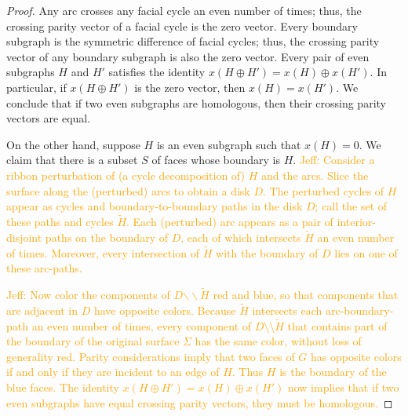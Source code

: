\documentclass[letterpaper,review]{siamart190516}
\def\Z{\mathbb{Z}}
\def\snip{\mathbin{\raisebox{0.15ex}{\rotatebox[origin=c]{60}{\Rightscissors}\!}}}
\def\snip{\mathbin{\backslash\!\!\backslash}}
\def\modified#1{\color{blue}#1 \color{black}}
\def\anote#1{\color{purple}Amir: #1 \color{black}}
\def\jnote#1{\textcolor{orange}{Jeff: #1}}
\def\enote#1{\textcolor{magenta}{Erin: #1}}
\begin{document}
\begin{proof}
Any arc crosses any facial cycle an even number of times; thus, the crossing parity vector of a facial cycle is the zero vector.  Every boundary subgraph is the symmetric difference of facial cycles; thus, the crossing parity vector of any boundary subgraph is also the zero vector.  Every pair of even subgraphs $H$ and $H'$ satisfies the identity $x(H\oplus H') = x(H) \oplus x(H')$.  In particular, if $x(H\oplus H')$ is the zero vector, then $x(H) = x(H')$.  We conclude that if two even subgraphs are homologous, then their crossing parity vectors are equal.

On the other hand, suppose $H$ is an even subgraph such that $x(H) = 0$.  We claim that there is a subset $S$ of faces whose boundary is $H$.  \jnote{Consider a ribbon perturbation of (a cycle decomposition of) $H$ and the arcs.  Slice the surface along the (perturbed) arcs to obtain a disk $D$.  The perturbed cycles of $H$ appear as cycles and boundary-to-boundary paths in the disk $D$; call the set of these paths and cycles $\tilde{H}$.  Each (perturbed) arc appears as a pair of interior-disjoint paths on the boundary of $D$, each of which intersects $\tilde{H}$ an even number of times.  Moreover, every intersection of $\tilde{H}$ with the boundary of $D$ lies on one of these arc-paths.}

\jnote{Now color the components of $D \snip \tilde{H}$ red and blue, so that components that are adjacent in $D$ have opposite colors.  Because $\tilde{H}$ intersects each arc-boundary-path an even number of times, every component of $D \setminus\setminus \tilde{H}$ that contains part of the boundary of the original surface $\Sigma$ has the same color, without loss of generality red.  Parity considerations imply that two faces of $G$ has opposite colors if and only if they are incident to an edge of $H$.  Thus $H$ is the boundary of the blue faces.  The identity $x(H\oplus H') = x(H) \oplus x(H')$ now implies that if two even subgraphs have equal crossing parity vectors, they must be homologous.}
\end{proof}

\end{document}
